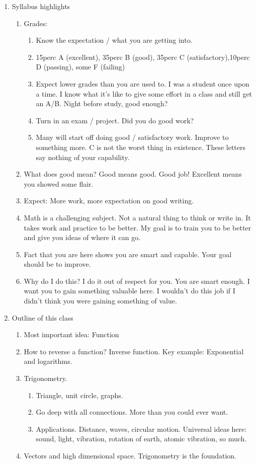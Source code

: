 \documentclass{article}
\begin{document}
\begin{enumerate}
\item Syllabus highlights
\begin{enumerate}
\item Grades: 
\begin{enumerate}
\item Know the expectation / what you are getting into.
\item 15perc A (excellent), 35perc B (good), 35perc C (satisfactory),10perc D (passing), some F (failing)
\item Expect lower grades than you are used to. I was a student once upon a time. I know what it's like to give some effort in a class and still get an A/B. Night before study, good enough? 
\item Turn in an exam / project. Did you do good work?
\item Many will start off doing good / satisfactory work. Improve to something more. C is not the worst thing in existence. These letters say nothing of your capability. 
\end{enumerate}
\item What does good mean? Good means good. Good job! Excellent means you showed some flair.
\item Expect: More work, more expectation on good writing.
\item Math is a challenging subject. Not a natural thing to think or write in. It takes work and practice to be better. My goal is to train you to be better and give you ideas of where it can go.
\item Fact that you are here shows you are smart and capable. Your goal should be to improve. 
\item Why do I do this? I do it out of respect for you. You are smart enough. I want you to gain something valuable here. I wouldn't do this job if I didn't think you were gaining something of value.
\end{enumerate}

\item Outline of this class
\begin{enumerate}
\item Most important idea: Function
\item How to reverse a function? Inverse function. Key example: Exponential and logarithms.
\item Trigonometry. 
\begin{enumerate}
\item Triangle, unit circle, graphs. 
\item Go deep with all connections. More than you could ever want.
\item Applications. Distance, waves, circular motion. Universal ideas here: sound, light, vibration, rotation of earth, atomic vibration, so much.
\end{enumerate}
\item Vectors and high dimensional space. Trigonometry is the foundation.
\end{enumerate}


\end{enumerate}
\end{document}
